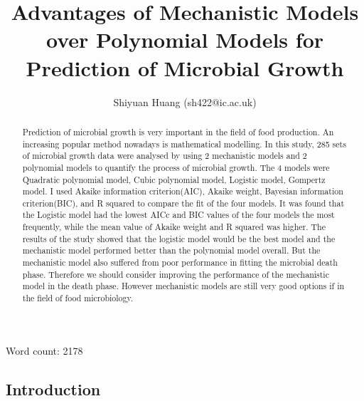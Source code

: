 \documentclass[11pt]{article}
\title{Advantages of Mechanistic Models over Polynomial Models for Prediction of Microbial Growth}
\author{Shiyuan Huang (sh422@ic.ac.uk)}
\affil{Imperial College London}
\date{}
\begin{document}
    
    \begin{titlepage}
      \maketitle
      
    \begin{center}
        Word count: 2178
    \end{center}
    
    \end{titlepage}

    \begin{linenumbers}
    
    \pagebreak

    \begin{abstract}
        
    Prediction of microbial growth is very important in the field of food production. An increasing popular method nowadays is mathematical modelling. In this study, 285 sets of microbial growth data were analysed by using 2 mechanistic models and 2 polynomial models to quantify the process of microbial growth. The 4 models were Quadratic polynomial model, Cubic polynomial model, Logistic model, Gompertz model. I used Akaike information criterion(AIC), Akaike weight, Bayesian information criterion(BIC), and R squared to compare the fit of the four models. It was found that the Logistic model had the lowest AICc and BIC values of the four models the most frequently, while the mean value of Akaike weight and R squared was higher. The results of the study showed that the logistic model would be the best model and the mechanistic model performed better than the polynomial model overall. But the mechanistic model also suffered from poor performance in fitting the microbial death phase. Therefore we should consider improving the performance of the mechanistic model in the death phase. However mechanistic models are still very good options if in the field of food microbiology.

    \end{abstract}

    \section{Introduction}


\end{linenumbers}
\end{document}
